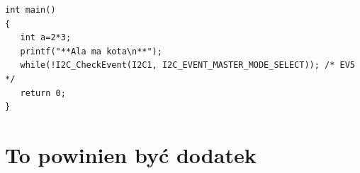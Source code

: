 \documentclass[magister,archiwum,polski]{pwrdyplom}
\begin{document}
\begin{lstlisting}
int main()
{
   int a=2*3;
   printf("**Ala ma kota\n**");
   while(!I2C_CheckEvent(I2C1, I2C_EVENT_MASTER_MODE_SELECT)); /* EV5 */
   return 0;
}
\end{lstlisting}


\appendixpage
\appendix
\addappheadtotoc

\chapter{To powinien być dodatek}\label{Dod1}

\lipsum[9-11]

\nocite{*}


\end{document}

